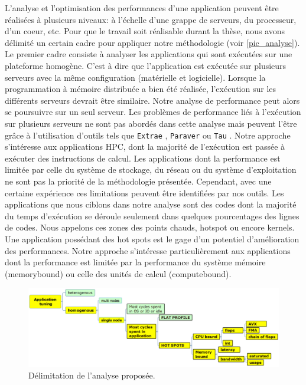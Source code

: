         L'analyse et l'optimisation des performances d'une application peuvent être réalisées à plusieurs niveaux:  à l'échelle d'une grappe de serveurs, du processeur, d'un coeur, etc. Pour que le travail soit réalisable durant la thèse, nous avons délimité un certain cadre pour appliquer notre méthodologie (voir \autoref{pic_analyse}). Le premier cadre consiste à analyser les applications qui sont exécutées sur une plateforme homogène. C'est à dire que l'application est exécutée sur plusieurs serveurs avec la même configuration (matérielle et logicielle). Lorsque la programmation à mémoire distribuée a bien été réalisée, l'exécution sur les différents serveurs devrait être similaire. Notre analyse de performance peut alors se poursuivre sur un seul serveur. Les problèmes de performance liés à l'exécution sur plusieurs serveurs ne sont pas abordés dans cette analyse mais peuvent l'être grâce à l'utilisation d'outils tels que \verb=Extrae= \cite{Rodriguez}, \verb=Paraver= \cite{Pillet1995}  ou \verb=Tau= \cite{Shende2006}. Notre approche s'intéresse aux applications HPC, dont la majorité de l'exécution est passée à exécuter des instructions de calcul. Les applications dont la performance est limitée par celle du système de stockage, du réseau ou du système d'exploitation ne sont pas la priorité de la méthodologie présentée. Cependant, avec une certaine expérience ces limitations peuvent être identifiées par nos outils. Les applications que nous ciblons dans notre analyse sont des codes dont la majorité du temps d'exécution se déroule seulement dans quelques pourcentages des lignes de codes. Nous appelons ces zones des points chauds, \gls{hotspot} ou encore \glspl{kernel}. Une application possédant des hot spots est le gage d'un potentiel d'amélioration des performances. Notre approche s'intéresse particulièrement aux applications dont la performance est limitée par la performance du système mémoire (\gls{memorybound}) ou celle des unités de calcul (\gls{computebound}).
        
         \begin{figure}[h!]
            \center
            \includegraphics[width=16cm]{images/analyse.png}
            \caption{\label{pic_analyse} Délimitation de l'analyse proposée.}
        \end{figure}
        
